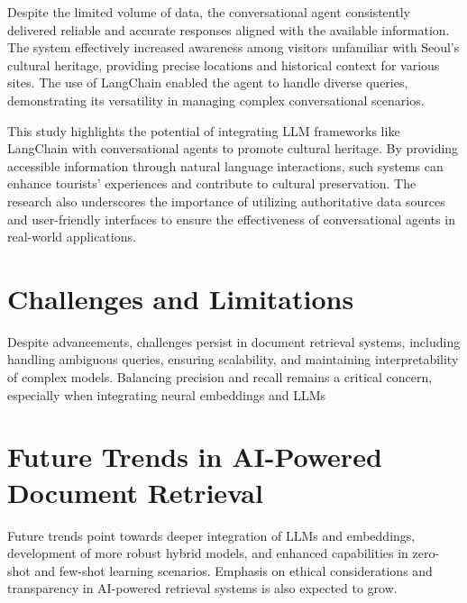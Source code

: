 Despite the limited volume of data, the conversational agent consistently delivered reliable and accurate responses aligned with the available information. The system effectively increased awareness among visitors unfamiliar with Seoul's cultural heritage, providing precise locations and historical context for various sites. The use of LangChain enabled the agent to handle diverse queries, demonstrating its versatility in managing complex conversational scenarios.

This study highlights the potential of integrating LLM frameworks like LangChain with conversational agents to promote cultural heritage. By providing accessible information through natural language interactions, such systems can enhance tourists' experiences and contribute to cultural preservation. The research also underscores the importance of utilizing authoritative data sources and user-friendly interfaces to ensure the effectiveness of conversational agents in real-world applications.



\section{Challenges and Limitations}

\noindent Despite advancements, challenges persist in document retrieval systems, including handling ambiguous queries, ensuring scalability, and maintaining interpretability of complex models. Balancing precision and recall remains a critical concern, especially when integrating neural embeddings and LLMs


\section{Future Trends in AI-Powered Document Retrieval}

\noindent Future trends point towards deeper integration of LLMs and embeddings, development of more robust hybrid models, and enhanced capabilities in zero-shot and few-shot learning scenarios. Emphasis on ethical considerations and transparency in AI-powered retrieval systems is also expected to grow.

